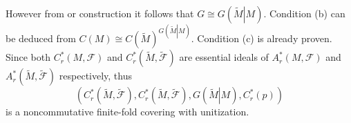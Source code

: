 \documentclass{beamer}
\theoremstyle{plain}
\newcommand{\sF}{\mathcal{F}}       %
\begin{document}
\begin{frame}
	However from or construction it follows that $G \cong G\left(\left.\widetilde M\right| M\right)$.
Condition (b) can be deduced from $C\left(M\right)\cong C\left(\widetilde M\right)^{G\left(\left.\widetilde M\right| M\right)}$. Condition (c) is already proven. Since both $C^*_r\left( M, {\sF}\right)$  and $C^*_r \left(\widetilde M, \widetilde{\sF}\right)$ are essential ideals of $A^*_r\left( M, {\sF}\right)$  and $A^*_r \left(\widetilde M, \widetilde{\sF}\right)$ respectively, thus $$
\left(C^*_r \left(\widetilde M, \widetilde{\sF}\right), C^*_r \left(\widetilde M, \widetilde{\sF}\right), G\left(\left.\widetilde M\right| M\right), C^*_r\left(p \right) \right)
$$
is a noncommutative finite-fold covering with unitization.

\end{frame}
\end{document}
